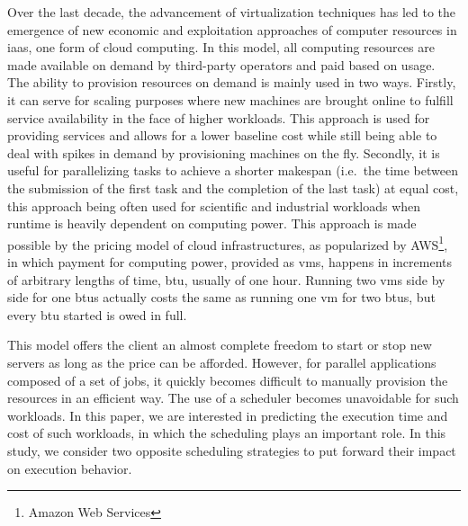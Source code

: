 \documentclass[10pt,conference,compsocconf]{IEEEtran}
\begin{document}
Over the  last decade, the advancement  of virtualization techniques has  led to
the emergence of new economic  and exploitation approaches of computer resources
in  \ac{iaas},  one form  of cloud  computing. In  this model,  all
computing resources  are made available  on demand by third-party  operators and
paid based  on usage.  The  ability to provision  resources on demand  is mainly
used in two ways.  Firstly, it can serve for scaling purposes where new machines
are  brought online  to  fulfill  service availability  in  the  face of higher 
workloads.  This approach  is used  for  providing services  and allows  for a  lower
baseline  cost  while  still  being  able  to deal  with  spikes  in  demand  by
provisioning machines on the fly. Secondly, it is useful for parallelizing tasks
to achieve a shorter makespan (i.e.\ the time between the submission of the first
task and the completion of the  last task)  at equal  cost, this  approach being  often used  for
scientific  and  industrial  workloads  when runtime  is  heavily  dependent  on
computing power.  This  approach is made possible by the  pricing model of cloud
infrastructures, as  popularized by AWS\footnote{Amazon Web  Services}, in which
payment  for computing  power, provided  as \acp{vm},  happens in  increments of
arbitrary lengths  of time, \ac{btu}, usually  of one hour. Running  two \acp{vm}
side by side for one \acp{btu} actually costs the same as running one \ac{vm} for two
\acp{btu}, but every \ac{btu} started is owed in full.

This model  offers the client  an almost complete freedom  to start or  stop new
servers as long as the price can be afforded. However, for parallel applications composed
of a set of jobs, it  quickly  becomes  difficult  to manually  provision  the
resources in an  efficient way.  The use of a  scheduler becomes unavoidable for
such workloads.   In this paper, we  are interested in predicting  the execution
time  and cost  of such  workloads, in  which the  scheduling plays  an
important role.  In  this study, we consider two  opposite scheduling strategies
to put forward their impact on execution behavior.
\end{document}
